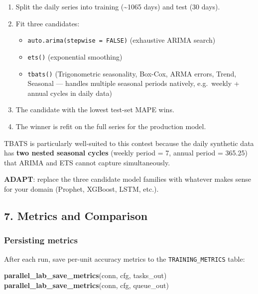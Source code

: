 \documentclass[
]{article}
\newenvironment{Shaded}{\begin{snugshade}}{\end{snugshade}}
\newcommand{\FunctionTok}[1]{\textcolor[rgb]{0.13,0.29,0.53}{\textbf{#1}}}
\newcommand{\NormalTok}[1]{#1}
\providecommand{\tightlist}{%
  \setlength{\itemsep}{0pt}\setlength{\parskip}{0pt}}
\begin{document}
\begin{enumerate}
\def\labelenumi{\arabic{enumi}.}
\tightlist
\item
  Split the daily series into training (\textasciitilde1065 days) and
  test (30 days).
\item
  Fit three candidates:

  \begin{itemize}
  \tightlist
  \item
    \texttt{auto.arima(stepwise\ =\ FALSE)} (exhaustive ARIMA search)
  \item
    \texttt{ets()} (exponential smoothing)
  \item
    \texttt{tbats()} (Trigonometric seasonality, Box-Cox, ARMA errors,
    Trend, Seasonal --- handles multiple seasonal periods natively,
    e.g.~weekly + annual cycles in daily data)
  \end{itemize}
\item
  The candidate with the lowest test-set MAPE wins.
\item
  The winner is refit on the full series for the production model.
\end{enumerate}

TBATS is particularly well-suited to this contest because the daily
synthetic data has \textbf{two nested seasonal cycles} (weekly period =
7, annual period = 365.25) that ARIMA and ETS cannot capture
simultaneously.

\textbf{ADAPT}: replace the three candidate model families with whatever
makes sense for your domain (Prophet, XGBoost, LSTM, etc.).

\subsection{7. Metrics and Comparison}\label{metrics-and-comparison}

\subsubsection{Persisting metrics}\label{persisting-metrics}

After each run, save per-unit accuracy metrics to the
\texttt{TRAINING\_METRICS} table:

\begin{Shaded}
\begin{Highlighting}[]
\FunctionTok{parallel\_lab\_save\_metrics}\NormalTok{(conn, cfg, tasks\_out)}
\FunctionTok{parallel\_lab\_save\_metrics}\NormalTok{(conn, cfg, queue\_out)}
\end{Highlighting}
\end{Shaded}
\end{document}
